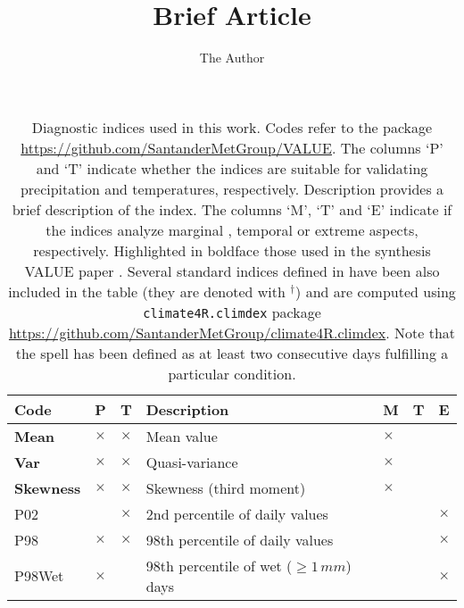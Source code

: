 \documentclass[11pt]{amsart}
\title{Brief Article}
\author{The Author}
\begin{document}
\maketitle


\begin{table}[!htb]
\caption{\label{t.indices} Diagnostic indices used in this work. Codes refer to the package \url{https://github.com/SantanderMetGroup/VALUE}. The columns `P' and `T' indicate whether the indices are suitable for validating precipitation and temperatures, respectively. Description provides a brief description of the index. The columns `M', `T' and `E' indicate if the indices analyze marginal \protect\cite{Gutierrez_et_al_VALUE_2019}, temporal \protect\cite{Maraun_et_al_VALUE_2019} or extreme \protect\cite{Hertig_et_al_VALUE_2019} aspects, respectively. Highlighted in boldface those used in the synthesis VALUE paper \protect\cite{VALUE_Synthesis_2019}. Several standard indices defined in \protect\cite{ETCCDI_1999} have been also included in the table (they are denoted with $^\dag$) and are computed using {\tt  climate4R.climdex} package  \url{https://github.com/SantanderMetGroup/climate4R.climdex}. Note that the spell has been defined as at least two consecutive days fulfilling a particular condition. 
}
\centering
{\tiny \begin{tabular}{lllllll}
\hline
  \textbf{Code}  & \textbf{P}& \textbf{T}& \textbf{Description}  & \textbf{M} & \textbf{T} & \textbf{E} \\
\hline
\textbf{Mean}               & $\times$  & $\times$  & Mean value                                                                & $\times$ & &   \\
\textbf{Var}                & $\times$  & $\times$  & Quasi-variance                                                            & $\times$ & &   \\
\textbf{Skewness}           & $\times$  & $\times$  & Skewness (third moment)					     & $\times$ & &   \\
P02                         &           & $\times$  & 2nd percentile of daily values                                            & & & $\times$   \\
P98                         & $\times$  & $\times$  & 98th percentile of daily values                       		            & & & $\times$   \\
P98Wet                      & $\times$  &           & 98th percentile of wet ($\ge 1\, mm$) days                                      & & & $\times$   \\

\end{tabular}}
\end{table}
\end{document}
